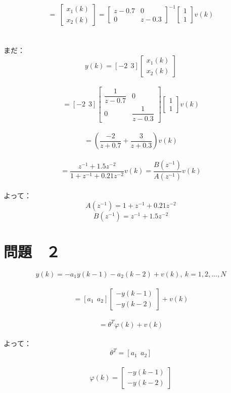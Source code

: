 \documentclass{article}
\begin{document}
$$= \ \begin{bmatrix}
  x_1(k)\\x_2(k)
\end{bmatrix}
=
\begin{bmatrix}
  z-0.7 & 0 \\ 0 & z-0.3
\end{bmatrix}^{-1}
\begin{bmatrix}
  1\\1
\end{bmatrix}
v(k)$$
~\\ ~\\

まだ：~\\
$$y(k)=[-2~~3]\begin{bmatrix}x_1(k)\\x_2(k)\end{bmatrix}$$
~\\

$$=[-2~~3]
\begin{bmatrix}
  \dfrac{1}{z-0.7} & 0 \\ 0 & \dfrac{1}{z-0.3}
\end{bmatrix}
\begin{bmatrix}
  1\\1
\end{bmatrix}
v(k)$$
~\\

$$=(\dfrac{-2}{z+0.7}+\dfrac{3}{z+0.3})v(k)$$
~\\

$$=\dfrac{z^{-1}+1.5z^{-2}}{1+z^{-1}+0.21z^{-2}}v(k) = \dfrac{B(z^{-1})}{A(z^{-1})}v(k)$$
~\\

よって：~\\
$$A(z^{-1}) = 1+z^{-1}+0.21z^{-2}$$
$$B(z^{-1}) = z^{-1}+1.5z^{-2}$$

\section{問題　２}
$$y(k)=-a_1y(k-1)-a_2(k-2)+v(k),\ k=1,2,...,N$$
~\\

$$=[a_1~~a_2]
\begin{bmatrix}
  -y(k-1)\\-y(k-2)
\end{bmatrix}
+v(k)
$$
~\\

$$=
\theta^T\varphi(k)+v(k)$$
~\\

よって：~\\
$$\theta^T=[a_1~~a_2]$$
~\\
$$\varphi(k)=
\begin{bmatrix}
  -y(k-1)\\-y(k-2)
\end{bmatrix}$$
~\\
\end{document}
